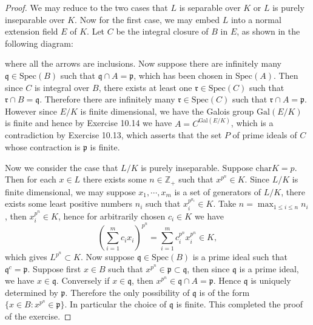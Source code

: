 \begin{proof}
We may reduce to the two cases that $L$ is separable over $K$ or $L$ is purely inseparable over $K$. Now for the first case, we may embed $L$ into a normal extension field $E$ of $K$. Let $C$ be the integral closure of $B$ in $E$, as shown in the following diagram: 
\begin{center}
\end{center}
where all the arrows are inclusions. Now suppose there are infinitely many $\mathfrak{q}\in\mathrm{Spec}(B)$ such that $\mathfrak{q}\cap A=\mathfrak{p}$, which has been chosen in $\mathrm{Spec}(A)$. Then since $C$ is integral over $B$, there exists at least one $\mathfrak{r}\in\mathrm{Spec}(C)$ such that $\mathfrak{r}\cap B=\mathfrak{q}$. Therefore there are infinitely many $\mathfrak{r}\in\mathrm{Spec}(C)$ such that $\mathfrak{r}\cap A=\mathfrak{p}$. However since $E/K$ is finite dimensional, we have the Galois group $\mathrm{Gal}(E/K)$ is finite and hence by Exercise 10.14 we have $A=C^{\mathrm{Gal}(E/K)}$, which is a contradiction by Exercise 10.13, which asserts that the set $P$ of prime ideals of $C$ whose contraction is $\mathfrak{p}$ is finite.\par
Now we consider the case that $L/K$ is purely inseparable. Suppose $\mathrm{char}K=p$. Then for each $x\in L$ there exists some $n\in\mathbb{Z}_+$ such that $x^{p^n}\in K$. Since $L/K$ is finite dimensional, we may suppose $x_1,\cdots,x_m$ is a set of generators of $L/K$, there exists some least positive numbers $n_i$ such that $x_i^{p^{n_i}}\in K$. Take $n=\max_{1\le i\le n}n_i$, then $x_i^{p^n}\in K$, hence for arbitrarily chosen $c_i\in K$ we have 
$$
\left( \sum_{i=1}^m{c_ix_i} \right) ^{p^n}=\sum_{i=1}^m{c_{i}^{p^n}x_{i}^{p^n}}\in K,
$$
which gives $L^{p^n}\subset K$. Now suppose $\mathfrak{q}\in\mathrm{Spec}(B)$ is a prime ideal such that $\mathfrak{q}^c=\mathfrak{p}$. Suppose first $x\in B$ such that $x^{p^n}\in\mathfrak{p}\subset\mathfrak{q}$, then since $\mathfrak{q}$ is a prime ideal, we have $x\in\mathfrak{q}$. Conversely if $x\in\mathfrak{q}$, then $x^{p^n}\in\mathfrak{q}\cap A=\mathfrak{p}$. Hence $\mathfrak{q}$ is uniquely determined by $\mathfrak{p}$. Therefore the only possibility of $\mathfrak{q}$ is of the form $\{x\in B:x^{p^n}\in\mathfrak{p}\}$. In particular the choice of $\mathfrak{q}$ is finite. This completed the proof of the exercise. 
\end{proof}

